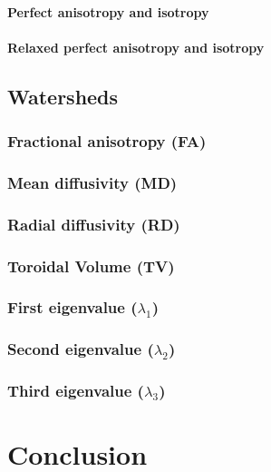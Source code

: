 \documentclass[a4paper,11pt]{report}
\begin{document}
    \subsubsection{Perfect anisotropy and isotropy}
    \subsubsection{Relaxed perfect anisotropy and isotropy}

  \section{Watersheds}
    \subsection{Fractional anisotropy (FA)}
    \subsection{Mean diffusivity (MD)}
    \subsection{Radial diffusivity (RD)}
    \subsection{Toroidal Volume (TV)}
    \subsection{First eigenvalue ($\lambda_1$)}
    \subsection{Second eigenvalue ($\lambda_2$)}
    \subsection{Third eigenvalue ($\lambda_3$)}

\chapter{Conclusion}
\end{document}
